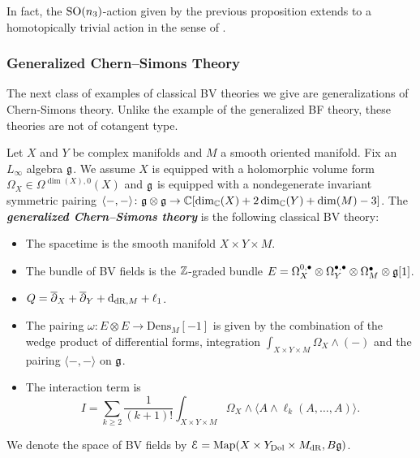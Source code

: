 \documentclass[10pt, oneside]{article}
\newcommand{\Dens}{\mathrm{Dens}}
\newcommand{\defterm}[1]{\textbf{\emph{#1}}}
\begin{document}
\begin{remark}
In fact, the $\mathrm{SO}(n_3)$-action given by the previous proposition extends to a homotopically trivial action in the sense of \cite[Section 2.4]{ElliottSafronov}.
\end{remark}

\subsubsection{Generalized Chern--Simons Theory} \label{gen_CS_section}
The next class of examples of classical BV theories we give are generalizations of Chern-Simons theory. Unlike the example of the generalized BF theory, these theories are not of cotangent type.

\begin{definition}
Let $X$ and $Y$ be complex manifolds and $M$ a smooth oriented manifold. Fix an $L_\infty$ algebra $\mathfrak g$. We assume $X$ is equipped with a holomorphic volume form $\Omega_X \in\Omega^{\dim(X), 0}(X)$ and $\mathfrak g$ is equipped with a nondegenerate invariant symmetric pairing $\langle-, -\rangle\colon \mathfrak g\otimes\mathfrak g\rightarrow \mathbb C[\dim_\mathbb C(X) + 2\dim_\mathbb C(Y) + \dim(M) - 3]$. The \defterm{generalized Chern--Simons theory} is the following classical BV theory:
\begin{itemize}
\item The spacetime is the smooth manifold $X\times Y\times M$.

\item The bundle of BV fields is the $\mathbb Z$-graded bundle $E = \Omega^{0,\bullet}_X \otimes \Omega^{\bullet,\bullet}_Y \otimes \Omega^\bullet_M \otimes \mathfrak g[1]$.

\item $Q = \overline{\partial}_X + \overline{\partial}_Y + {\rm d}_{\mathrm{dR}, M} + \ell_1$.

\item The pairing $\omega\colon E\otimes E\rightarrow \Dens_M[-1]$ is given by the combination of the wedge product of differential forms, integration $\int_{X\times Y\times M} \Omega_X\wedge (-)$ and the pairing $\langle -, -\rangle$ on $\mathfrak g$.

\item The interaction term is
\[I = \sum_{k\geq 2}\frac{1}{(k+1)!} \int_{X\times Y\times M} \Omega_X\wedge \langle A\wedge \ell_k(A, \dots, A)\rangle.\]
\end{itemize}
We denote the space of BV fields by $\mathcal E = \operatorname{Map}(X\times Y_{\mathrm{Dol}}\times M_{\mathrm{dR}}, B \mathfrak g)$.
\label{def:generalizedCS}
\end{definition}
\end{document}
